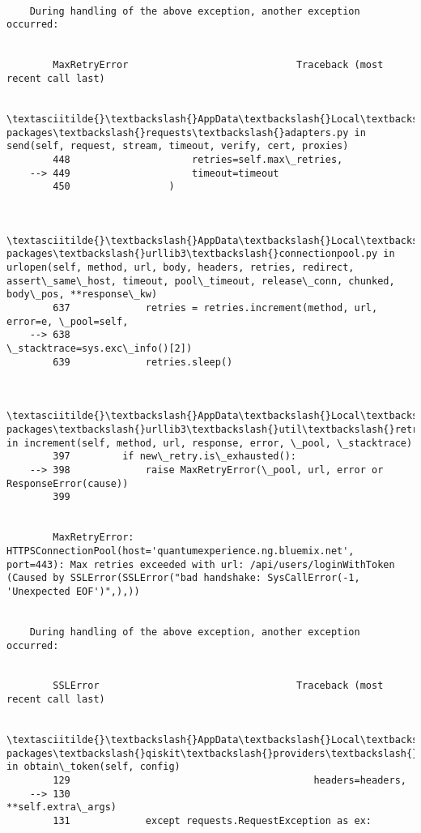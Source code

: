 \documentclass[11pt]{article}
\begin{document}
\begin{Verbatim}[commandchars=\\\{\}]
        
    During handling of the above exception, another exception occurred:
    

        MaxRetryError                             Traceback (most recent call last)

        \textasciitilde{}\textbackslash{}AppData\textbackslash{}Local\textbackslash{}Continuum\textbackslash{}anaconda3\textbackslash{}lib\textbackslash{}site-packages\textbackslash{}requests\textbackslash{}adapters.py in send(self, request, stream, timeout, verify, cert, proxies)
        448                     retries=self.max\_retries,
    --> 449                     timeout=timeout
        450                 )
    

        \textasciitilde{}\textbackslash{}AppData\textbackslash{}Local\textbackslash{}Continuum\textbackslash{}anaconda3\textbackslash{}lib\textbackslash{}site-packages\textbackslash{}urllib3\textbackslash{}connectionpool.py in urlopen(self, method, url, body, headers, retries, redirect, assert\_same\_host, timeout, pool\_timeout, release\_conn, chunked, body\_pos, **response\_kw)
        637             retries = retries.increment(method, url, error=e, \_pool=self,
    --> 638                                         \_stacktrace=sys.exc\_info()[2])
        639             retries.sleep()
    

        \textasciitilde{}\textbackslash{}AppData\textbackslash{}Local\textbackslash{}Continuum\textbackslash{}anaconda3\textbackslash{}lib\textbackslash{}site-packages\textbackslash{}urllib3\textbackslash{}util\textbackslash{}retry.py in increment(self, method, url, response, error, \_pool, \_stacktrace)
        397         if new\_retry.is\_exhausted():
    --> 398             raise MaxRetryError(\_pool, url, error or ResponseError(cause))
        399 
    

        MaxRetryError: HTTPSConnectionPool(host='quantumexperience.ng.bluemix.net', port=443): Max retries exceeded with url: /api/users/loginWithToken (Caused by SSLError(SSLError("bad handshake: SysCallError(-1, 'Unexpected EOF')",),))

        
    During handling of the above exception, another exception occurred:
    

        SSLError                                  Traceback (most recent call last)

        \textasciitilde{}\textbackslash{}AppData\textbackslash{}Local\textbackslash{}Continuum\textbackslash{}anaconda3\textbackslash{}lib\textbackslash{}site-packages\textbackslash{}qiskit\textbackslash{}providers\textbackslash{}ibmq\textbackslash{}api\textbackslash{}ibmqconnector.py in obtain\_token(self, config)
        129                                          headers=headers,
    --> 130                                          **self.extra\_args)
        131             except requests.RequestException as ex:
    


\end{Verbatim}
\end{document}

